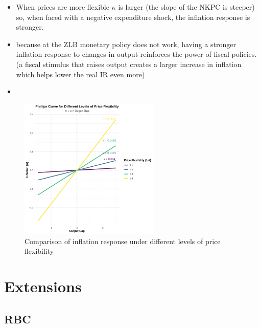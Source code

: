 \documentclass{article}
\begin{document}
\begin{flexbox}
    \begin{itemize}
        \item When prices are more flexible $\kappa$ is larger (the slope of the NKPC is steeper) so, when faced with a negative expenditure shock, the inflation response is stronger. 
        \item because at the ZLB monetary policy does not work, having a stronger inflation response to changes in output reinforces the power of fiscal policies. (a fiscal stimulus that raises output creates a larger increase in inflation which helps lower the real IR even more)
        \item 
    \end{itemize}
\begin{figure}[H]
    \centering
    \includegraphics[width=0.6\textwidth]{Pictures/priceflex.png}
    \caption{Comparison of inflation response under different levels of price flexibility}
    \label{fig: Comparison inflation response under varying flex-price}
\end{figure}
\end{flexbox}












\section{Extensions}

\subsection{RBC}
\end{document}
